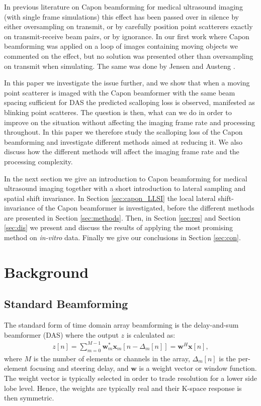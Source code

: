 \documentclass[journal]{IEEEtran}
\renewcommand{\vec}[1]{\mathbf{#1}}
\newcommand\comment[1]{\textit{{\color{red}(#1)}}}
\begin{document}
In previous literature on Capon beamforming for medical ultrasound imaging (with single frame simulations) this effect has been passed over in silence by either oversampling on transmit, or by carefully position point scatterers exactly on transmit-receive beam pairs, or by ignorance. In our first work where Capon beamforming was applied on a loop of images containing moving objects \cite{Asen2012, Asen} we commented on the effect, but no solution was presented other than oversampling on transmit when simulating. The same was done by Jensen and Austeng \cite{Jensen2012}.

In this paper we investigate the issue further, and we show that when a moving point scatterer is imaged with the Capon beamformer with the same beam spacing sufficient for DAS the predicted scalloping loss is observed, manifested as blinking point scatteres. The question is then, what can we do in order to improve on the situation without affecting the imaging frame rate and processing throughout. In this paper we therefore study the scalloping loss of the Capon beamforming and investigate different methods aimed at reducing it. We also discuss how the different methods will affect the imaging frame rate and the processing complexity. 

In the next section we give an introduction to Capon beamforming for medical ultrasound imaging together with a short introduction to lateral sampling and spatial shift invariance. In Section \ref{sec:capon_LLSI} the local lateral shift-invariance of the Capon beamformer is investigated, before the different methods are presented in Section \ref{sec:methods}. Then, in Section \ref{sec:res} and Section \ref{sec:dis} we present and discuss the results of applying the most promising method on \textit{in-vitro} data. Finally we give our conclusions in Section \ref{sec:con}.



\section{Background}
\subsection{Standard Beamforming}
The standard form of time domain array beamforming is the delay-and-sum beamformer (DAS) where the output $z$ is calculated as:
\begin{align}\label{eq:das}
z[n] = \sum_{m = 0}^{M-1}\vec{w}_m^*\vec{x}_m[n - \Delta_m[n]] = \vec{w}^H\vec{x}[n],
\end{align}
where $M$ is the number of elements or channels in the array, $\Delta_m[n]$ is the per-element focusing and steering delay, and $\vec{w}$ is a weight vector or window function. The weight vector is typically selected in order to trade resolution for a lower side lobe level. Hence, the weights are typically real and their K-space response is then symmetric.
\end{document}
